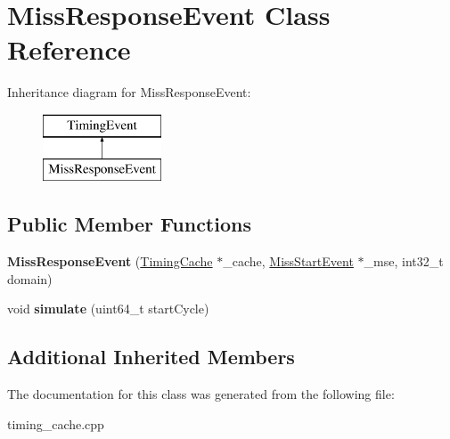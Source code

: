 \hypertarget{classMissResponseEvent}{\section{Miss\-Response\-Event Class Reference}
\label{classMissResponseEvent}
}
Inheritance diagram for Miss\-Response\-Event\-:\begin{figure}[H]
\begin{center}
\leavevmode
\includegraphics[height=2.000000cm]{classMissResponseEvent}
\end{center}
\end{figure}
\subsection*{Public Member Functions}
\begin{DoxyCompactItemize}
\item 
\hypertarget{classMissResponseEvent_a99eefb4dcfb6ba52fa99f4dcf3547d0a}{{\bfseries Miss\-Response\-Event} (\hyperlink{classTimingCache}{Timing\-Cache} $\ast$\-\_\-cache, \hyperlink{classMissStartEvent}{Miss\-Start\-Event} $\ast$\-\_\-mse, int32\-\_\-t domain)}\label{classMissResponseEvent_a99eefb4dcfb6ba52fa99f4dcf3547d0a}

\item 
\hypertarget{classMissResponseEvent_a2d5c1b98228a272d36d97e21a600a9fc}{void {\bfseries simulate} (uint64\-\_\-t start\-Cycle)}\label{classMissResponseEvent_a2d5c1b98228a272d36d97e21a600a9fc}

\end{DoxyCompactItemize}
\subsection*{Additional Inherited Members}


The documentation for this class was generated from the following file\-:\begin{DoxyCompactItemize}
\item 
timing\-\_\-cache.\-cpp\end{DoxyCompactItemize}
